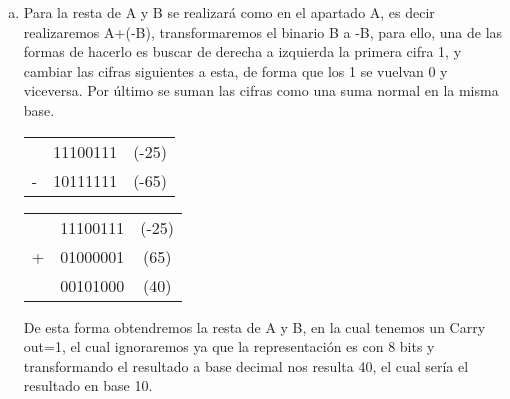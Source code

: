 \begin{frame}
    \begin{solution}
        \begin{enumerate}[b)]
            \item 
            
                Para la resta de A y B se realizará como en el apartado A, es decir realizaremos A+(-B), transformaremos el binario B a -B, para ello, una de las formas de hacerlo es buscar de derecha a izquierda la primera cifra 1, y cambiar las cifras siguientes a esta, de forma que los 1 se vuelvan 0 y viceversa. Por último se suman las cifras como una suma normal en la misma base.

                \begin{table}[]
                    \begin{tabular}{c c c}
                         & 11100111 & (-25) \\
                        - & 10111111 & (-65) \\
                        \hline
                    \end{tabular}
                    \qquad
                    \Longleftarrow
                    \qquad
                    \begin{tabular}{c c c}
                         & 11100111 & (-25) \\
                        + & 01000001 & (65) \\
                        \hline
                        & 00101000 & (40) \\
                    \end{tabular}
                \end{table}
                De esta forma obtendremos la resta de A y B, en la cual tenemos un Carry out=1, el cual ignoraremos ya que la representación es con 8 bits y transformando el resultado a base decimal nos resulta 40, el cual sería el resultado en base 10.
        \end{enumerate}
    \end{solution}
\end{frame}